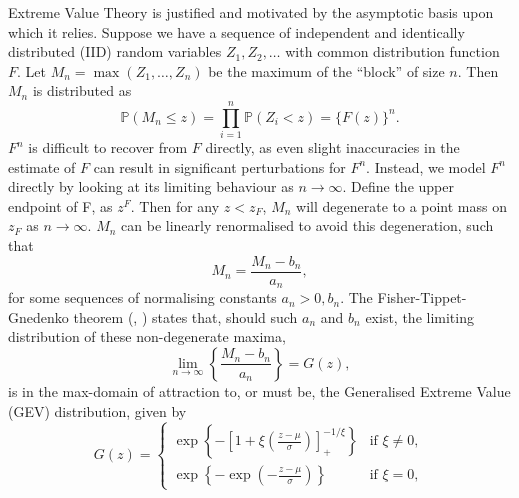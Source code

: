 \documentclass{article}
\numberwithin{equation}{section}
\begin{document}
Extreme Value Theory is justified and motivated by the asymptotic basis upon which it relies.
Suppose we have a sequence of independent and identically distributed (IID) random variables $Z_1, Z_2, \ldots$ with common distribution function $F$. 
Let $M_n = \max(Z_1, \ldots, Z_n)$ be the maximum of the ``block'' of size $n$.
Then $M_n$ is distributed as
\[
  \mathbb{P}(M_n \le z) = \prod_{i = 1}^{n}{\mathbb{P}(Z_i < z)} = \{F(z)\}^n.
\]
$F^n$ is difficult to recover from $F$ directly, as even slight inaccuracies in the estimate of $F$ can result in significant perturbations for $F^n$.
Instead, we model $F^n$ directly by looking at its limiting behaviour as $n \to \infty$.
Define the upper endpoint of F, as $z^F$. %
Then for any $z < z_F$, $M_n$ will degenerate to a point mass on $z_F$ as $n \to \infty$.
$M_n$ can be linearly renormalised to avoid this degeneration, such that
\[
  M_n = \frac{M_n - b_n}{a_n},
\]
for some sequences of normalising constants $a_n > 0, b_n$. 
The Fisher-Tippet-Gnedenko theorem (\cite{Fisher1928}, \cite{Gnedenko1943}) states that, should such $a_n$ and $b_n$ exist, the limiting distribution of these non-degenerate maxima,
\begin{equation} \label{eq:uni_limiting_dist}
  \lim_{n \to \infty}\left\{\frac{M_n - b_n}{a_n}\right\} = G(z),
\end{equation}
is in the max-domain of attraction to, or must be, the Generalised Extreme Value (GEV) distribution, given by 
\begin{equation} \label{eq:gev}
  G(z) = \begin{cases}
    \exp\left\{-\left[1 + \xi\left(\frac{z - \mu}{\sigma}\right)\right]_+^{-1/\xi}\right\} & \text{if } \xi \ne 0, \\
    \exp\left\{-\exp\left(-\frac{z - \mu}{\sigma}\right)\right\} & \text{if } \xi = 0,
  \end{cases}
\end{equation}
\end{document}
